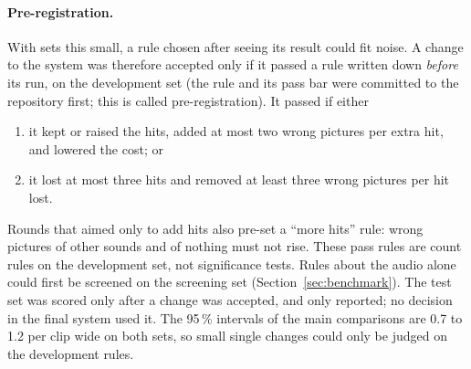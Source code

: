 \paragraph{Pre-registration.} With sets this small, a rule chosen after seeing its result could fit noise. A change to the system was therefore
accepted only if it passed a rule written down \emph{before} its run, on the development set (the rule and its pass
bar were committed to the repository first; this is called pre-registration). It passed if either
\begin{enumerate}[label=(\alph*)]
  \item it kept or raised the hits, added at most two wrong pictures per extra hit, and lowered the cost; or
  \item it lost at most three hits and removed at least three wrong pictures per hit lost.
\end{enumerate}
Rounds that aimed only to add hits also pre-set a ``more hits'' rule: wrong pictures of other sounds and of
nothing must not rise. These pass rules are count rules on the development set, not significance tests.
Rules about the audio alone could first be screened on the screening set (Section~\ref{sec:benchmark}). The test set
was scored only after a change was accepted, and only reported; no decision in the final system used it. The 95\,\% intervals of the main comparisons are 0.7 to 1.2 per clip wide on both sets, so small single changes could only be judged on the development rules.
